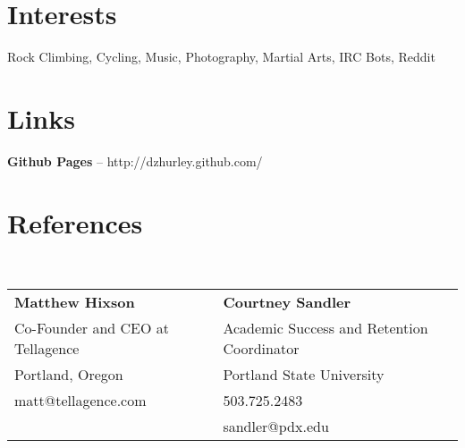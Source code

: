 \documentclass[margin,line]{resume}
\begin{document}
\begin{resume}
    \section{\mysidestyle Interests}

    Rock Climbing, Cycling, Music, Photography, Martial Arts, IRC Bots, Reddit

    \section{\mysidestyle Links}

    \textbf{Github Pages} -- http://dzhurley.github.com/

    \section{\mysidestyle References}

    \vspace{1mm}\\
    \begin{tabular}{@{}ll}
        \textbf{Matthew Hixson}           &  \textbf{Courtney Sandler}                   \\
        Co-Founder and CEO at Tellagence  &  Academic Success and Retention Coordinator  \\
        Portland, Oregon                  &  Portland State University                   \\
        matt@tellagence.com               &  503.725.2483                                \\
                                          &  sandler@pdx.edu                             \\
    \end{tabular}

\end{resume}
\end{document}
